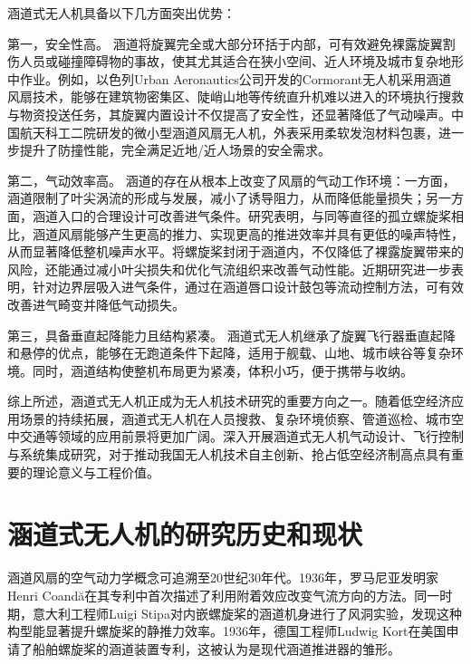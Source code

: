涵道式无人机具备以下几方面突出优势：

第一，安全性高。 涵道将旋翼完全或大部分环括于内部，可有效避免裸露旋翼割伤人员或碰撞障碍物的事故，使其尤其适合在狭小空间、近人环境及城市复杂地形中作业。例如，以色列Urban Aeronautics公司开发的Cormorant无人机采用涵道风扇技术，能够在建筑物密集区、陡峭山地等传统直升机难以进入的环境执行搜救与物资投送任务，其旋翼内置设计不仅提高了安全性，还显著降低了气动噪声。中国航天科工二院研发的微小型涵道风扇无人机，外表采用柔软发泡材料包裹，进一步提升了防撞性能，完全满足近地/近人场景的安全需求。

第二，气动效率高。 涵道的存在从根本上改变了风扇的气动工作环境：一方面，涵道限制了叶尖涡流的形成与发展，减小了诱导阻力，从而降低能量损失；另一方面，涵道入口的合理设计可改善进气条件。研究表明，与同等直径的孤立螺旋桨相比，涵道风扇能够产生更高的推力、实现更高的推进效率并具有更低的噪声特性\cite{Numerical_and_Experimental_Analyses_of_the_Ducted_Fan}，从而显著降低整机噪声水平\cite{li2005aerodynamic}。将螺旋桨封闭于涵道内，不仅降低了裸露旋翼带来的风险，还能通过减小叶尖损失和优化气流组织来改善气动性能\cite{Aerodynamic_performance_assessment_of_a_ducted_fan_UAV}。近期研究进一步表明，针对边界层吸入进气条件，通过在涵道唇口设计鼓包等流动控制方法，可有效改善进气畸变并降低气动损失\cite{wangshuo}。

第三，具备垂直起降能力且结构紧凑。 涵道式无人机继承了旋翼飞行器垂直起降和悬停的优点\cite{Xia}，能够在无跑道条件下起降，适用于舰载、山地、城市峡谷等复杂环境。同时，涵道结构使整机布局更为紧凑，体积小巧，便于携带与收纳。

综上所述，涵道式无人机正成为无人机技术研究的重要方向之一。随着低空经济应用场景的持续拓展，涵道式无人机在人员搜救、复杂环境侦察、管道巡检、城市空中交通等领域的应用前景将更加广阔。深入开展涵道式无人机气动设计、飞行控制与系统集成研究，对于推动我国无人机技术自主创新、抢占低空经济制高点具有重要的理论意义与工程价值。

\section{涵道式无人机的研究历史和现状}
涵道风扇的空气动力学概念可追溯至20世纪30年代。1936年，罗马尼亚发明家Henri Coandă在其专利中首次描述了利用附着效应改变气流方向的方法\cite{coanda1938propelling}。同一时期，意大利工程师Luigi Stipa对内嵌螺旋桨的涵道机身进行了风洞实验，发现这种构型能显著提升螺旋桨的静推力效率\cite{stipa1932experiments}。1936年，德国工程师Ludwig Kort在美国申请了船舶螺旋桨的涵道装置专利，这被认为是现代涵道推进器的雏形\cite{kort1936combined}。

